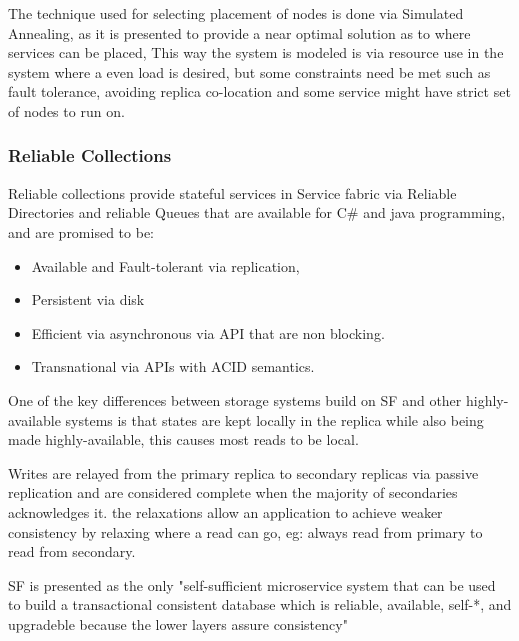 \documentclass[a4paper,10pt,titlepage]{report}
\begin{document}
    The technique used for selecting placement of nodes is done via Simulated Annealing, as it is presented to provide a near optimal solution as to where services can be placed, This way the system is modeled is via resource use in the system where a even load is desired, but some constraints need be met such as fault tolerance, avoiding replica co-location and some service might have strict set of nodes to run on. \\
    \vspace{5mm}

    \subsubsection{Reliable Collections}

    Reliable collections provide stateful services in Service fabric via Reliable Directories and reliable Queues that are available for C\# and java programming, and are promised to be:
    \begin{itemize}
        \item Available and Fault-tolerant via replication,
        \item Persistent via disk
        \item Efficient via asynchronous via API that are non blocking.
        \item Transnational via APIs with ACID semantics.
    \end{itemize}

    One of the key differences between storage systems build on SF and other highly-available systems is that states are kept locally in the replica while also being made highly-available, this causes most reads to be local.\\
    \vspace{5mm}

    Writes are relayed from the primary replica to secondary replicas via passive replication and are considered complete when the majority of secondaries acknowledges it. the relaxations allow an application to achieve weaker consistency by relaxing where a read can go, eg: always read from primary to read from secondary. \\
    \vspace{5mm}

    SF is presented as the only "self-sufficient microservice system that can be used to build a transactional consistent database which is reliable, available, self-*, and upgradeble because the lower layers assure consistency"\cite{SFpaper} \\
    \vspace{5mm}
\end{document}
